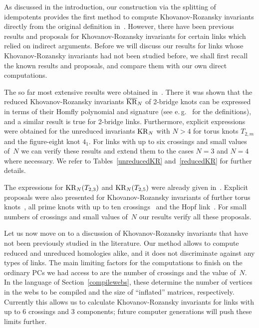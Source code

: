 \documentclass{compositio}
\theoremstyle{definition}
\numberwithin{equation}{section}
\begin{document}
As discussed in the introduction, our construction via the splitting of idempotents provides the first method to compute Khovanov-Rozansky invariants directly from the original definition in~\cite{kr0401268}. However, there have been previous results and proposals for Khovanov-Rozansky invariants for certain links which relied on indirect arguments. Before we will discuss our results for links whose Khovanov-Rozansky invariants had not been studied before, we shall first recall the known results and proposals, and compare them with our own direct computations. 

The so far most extensive results were obtained in~\cite{r0508510, r0607544}. There it was shown that the reduced Khovanov-Rozansky invariants $\overline{\operatorname{KR}}_{N}$ of 2-bridge knots can be expressed in terms of their Homfly polynomial and signature (see e.\,g.~\cite{kawauchibook} for the definitions), and a similar result is true for 2-bridge links. Furthermore, explicit expressions were obtained for the unreduced invariants $\operatorname{KR}_{N}$ with $N>4$ for torus knots $T_{2,m}$ and the figure-eight knot $4_{1}$. For links with up to six crossings and small values of~$N$ we can verify these results and extend them to the cases $N=3$ and $N=4$ where necessary. We refer to Tables~\ref{unreducedKR} and~\ref{reducedKR} for further details. 

The expressions for $\operatorname{KR}_{N}(T_{2,3})$ and $\operatorname{KR}_{N}(T_{2,5})$ were already given in~\cite{gsv0412243}. Explicit proposals were also presented for Khovanov-Rozansky invariants of further torus knots~\cite{dgr0505662, as1105.5117}, all prime knots with up to ten crossings~\cite{dgr0505662} and the Hopf link~\cite{gikv0705.1368}. For small numbers of crossings and small values of~$N$ our results verify all these proposals.

\medskip

Let us now move on to a discussion of Khovanov-Rozansky invariants that have not been previously studied in the literature. Our method allows to compute reduced and unreduced homologies alike, and it does not discriminate against any types of links. The main limiting factors for the computations to finish on the ordinary PCs we had access to are the number of crossings and the value of~$N$. In the language of Section~\ref{compilewebs}, these determine the number of vertices in the webs to be compiled and the size of ``inflated'' matrices, respectively. Currently this allows us to calculate Khovanov-Rozansky invariants for links with up to 6 crossings and 3 components; future computer generations will push these limits further. 
\end{document}
